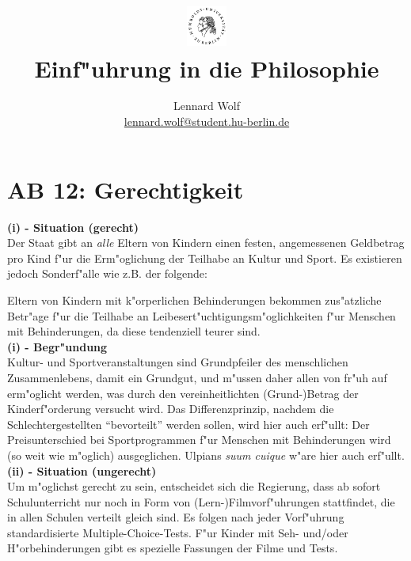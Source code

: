 \documentclass[a4paper]{article}
\date{\vspace{-3ex}}
\begin{document}
\title{
    \vspace{-30pt}
	\includegraphics*[width=0.1\textwidth,left]{images/hu_logo2.png}\\
	\vspace{-10pt}
	Einf"uhrung in die Philosophie}
\author{Lennard Wolf\\
        \small{\href{mailto:lennard.wolf@student.hu-berlin.de}{lennard.wolf@student.hu-berlin.de}}}
\maketitle
\vspace{0pt}

\section*{AB 12: Gerechtigkeit}
\large

\noindent\textbf{(i) - Situation (gerecht)}\\
\noindent Der Staat gibt an \emph{alle} Eltern von Kindern einen festen, angemessenen Geldbetrag pro Kind f"ur die Erm"oglichung der Teilhabe an Kultur und Sport. Es existieren jedoch Sonderf"alle wie z.B. der folgende: 

Eltern von Kindern mit k"orperlichen Behinderungen bekommen zus"atzliche Betr"age f"ur die Teilhabe an Leibesert"uchtigungsm"oglichkeiten f"ur Menschen mit Behinderungen, da diese  tendenziell teurer sind.\\

\noindent\textbf{(i) - Begr"undung}\\
\noindent Kultur- und Sportveranstaltungen sind Grundpfeiler des menschlichen Zusammenlebens, damit ein Grundgut, und m"ussen daher allen von fr"uh auf erm"oglicht werden, was durch den vereinheitlichten (Grund-)Betrag der Kinderf"orderung versucht wird. Das Differenzprinzip, nachdem die Schlechtergestellten "`bevorteilt"' werden sollen, wird hier auch erf"ullt: Der Preisunterschied bei Sportprogrammen f"ur Menschen mit Behinderungen wird (so weit wie m"oglich) ausgeglichen. Ulpians \emph{suum cuique} w"are hier auch erf"ullt.\\
 
\noindent\textbf{(ii) - Situation (ungerecht)}\\
\noindent Um m"oglichst gerecht zu sein, entscheidet sich die Regierung, dass ab sofort Schulunterricht nur noch in Form von (Lern-)Filmvorf"uhrungen stattfindet, die in allen Schulen verteilt gleich sind. Es folgen nach jeder Vorf"uhrung standardisierte Multiple-Choice-Tests. F"ur Kinder mit Seh- und/oder H"orbehinderungen gibt es spezielle Fassungen der Filme und Tests.
\end{document}
